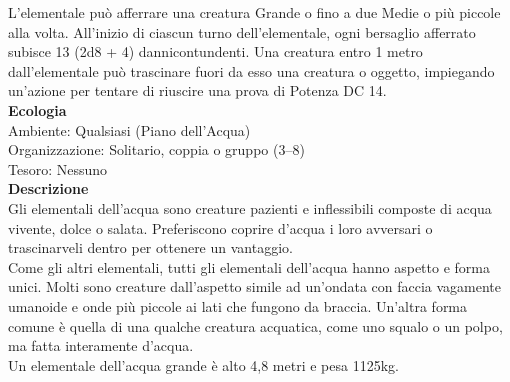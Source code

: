 \begin{multicols}{2}
L'elementale può afferrare una creatura Grande o fino a due Medie o più piccole alla volta. All'inizio di ciascun turno dell'elementale, ogni bersaglio afferrato subisce 13 (2d8 + 4) dannicontundenti. Una creatura entro 1 metro dall'elementale può trascinare fuori da esso una  creatura o oggetto, impiegando un'azione per tentare di riuscire una prova di Potenza DC 14.\\
\textbf{Ecologia}\\
Ambiente: Qualsiasi (Piano dell'Acqua)\\
Organizzazione: Solitario, coppia o gruppo (3–8)\\
Tesoro: Nessuno\\
\textbf{Descrizione}\\
Gli elementali dell'acqua sono creature pazienti e inflessibili composte di acqua vivente, dolce o salata. Preferiscono coprire d’acqua i loro avversari o trascinarveli dentro per ottenere un vantaggio.\\
Come gli altri elementali, tutti gli elementali dell'acqua hanno aspetto e forma unici. Molti sono creature dall'aspetto simile ad un’ondata con faccia vagamente umanoide e onde più piccole ai lati che fungono da braccia. Un’altra forma comune è quella di una qualche creatura acquatica, come uno squalo o un polpo, ma fatta interamente d'acqua.\\
Un elementale dell'acqua grande è alto 4,8 metri e pesa 1125kg.\\


\end{multicols}
